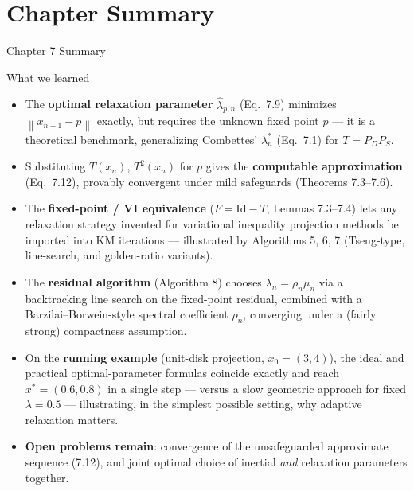 \documentclass[aspectratio=169,10pt]{beamer}
\newcommand{\norm}[1]{\left\|#1\right\|}
\newcommand{\Id}{\mathrm{Id}}
\begin{document}
\section{Chapter Summary}

\begin{frame}{Chapter 7 Summary}

  \begin{block}{What we learned}
    \begin{itemize}
      \item The \textbf{optimal relaxation parameter} $\widehat\lambda_{p,n}$
            (Eq.\ 7.9) minimizes $\norm{x_{n+1}-p}$ exactly, but
            requires the unknown fixed point $p$ --- it is a
            theoretical benchmark, generalizing Combettes'
            $\lambda_n^*$ (Eq.\ 7.1) for $T=P_DP_S$.
      \item Substituting $T(x_n)$, $T^2(x_n)$ for $p$ gives the
            \textbf{computable approximation} (Eq.\ 7.12), provably
            convergent under mild safeguards (Theorems 7.3--7.6).
      \item The \textbf{fixed-point / VI equivalence}
            ($F=\Id-T$, Lemmas 7.3--7.4) lets any relaxation
            strategy invented for variational inequality projection
            methods be imported into KM iterations --- illustrated
            by Algorithms 5, 6, 7 (Tseng-type, line-search, and
            golden-ratio variants).
      \item The \textbf{residual algorithm} (Algorithm 8) chooses
            $\lambda_n=\rho_n\mu_n$ via a backtracking line search
            on the fixed-point residual, combined with a
            Barzilai--Borwein-style spectral coefficient $\rho_n$,
            converging under a (fairly strong) compactness
            assumption.
      \item On the \textbf{running example} (unit-disk projection,
            $x_0=(3,4)$), the ideal and practical optimal-parameter
            formulas coincide exactly and reach $x^*=(0.6,0.8)$ in a
            single step --- versus a slow geometric approach for
            fixed $\lambda=0.5$ --- illustrating, in the simplest
            possible setting, why adaptive relaxation matters.
      \item \textbf{Open problems remain}: convergence of the
            unsafeguarded approximate sequence (7.12), and joint
            optimal choice of inertial \emph{and} relaxation
            parameters together.
    \end{itemize}
  \end{block}

\end{frame}
\end{document}
